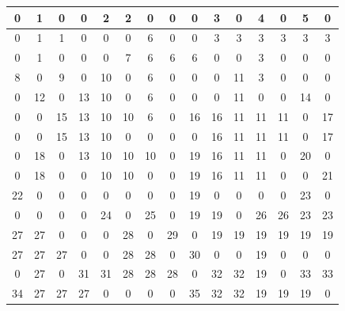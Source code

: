 \begin{figure}[H]
	\centering
	\scriptsize %
	\setlength{\tabcolsep}{3.5pt} %
	\renewcommand{\arraystretch}{1.3} %
	\begin{minipage}{0.4\textwidth}
		\centering
		\begin{center}
			\begin{tabular}{|*{15}{c|}}
				\hline
				0 & 1 & 0 & 0 & 2 & 2 & 0 & 0 & 0 & 3 & 0 & 4 & 0 & 5 & 0 \\
				\hline
				0 & 1 & 1 & 0 & 0 & 0 & 6 & 0 & 0 & 3 & 3 & 3 & 3 & 3 & 3 \\
				\hline
				0 & 1 & 0 & 0 & 0 & 7 & 6 & 6 & 6 & 0 & 0 & 3 & 0 & 0 & 0 \\
				\hline
				8 & 0 & 9 & 0 & 10 & 0 & 6 & 0 & 0 & 0 & 11 & 3 & 0 & 0 & 0 \\
				\hline
				0 & 12 & 0 & 13 & 10 & 0 & 6 & 0 & 0 & 0 & 11 & 0 & 0 & 14 & 0 \\
				\hline
				0 & 0 & 15 & 13 & 10 & 10 & 6 & 0 & 16 & 16 & 11 & 11 & 11 & 0 & 17 \\
				\hline
				0 & 0 & 15 & 13 & 10 & 0 & 0 & 0 & 0 & 16 & 11 & 11 & 11 & 0 & 17 \\
				\hline
				0 & 18 & 0 & 13 & 10 & 10 & 10 & 0 & 19 & 16 & 11 & 11 & 0 & 20 & 0 \\
				\hline
				0 & 18 & 0 & 0 & 10 & 10 & 0 & 0 & 19 & 16 & 11 & 11 & 0 & 0 & 21 \\
				\hline
				22 & 0 & 0 & 0 & 0 & 0 & 0 & 0 & 19 & 0 & 0 & 0 & 0 & 23 & 0 \\
				\hline
				0 & 0 & 0 & 0 & 24 & 0 & 25 & 0 & 19 & 19 & 0 & 26 & 26 & 23 & 23 \\
				\hline
				27 & 27 & 0 & 0 & 0 & 28 & 0 & 29 & 0 & 19 & 19 & 19 & 19 & 19 & 19 \\
				\hline
				27 & 27 & 27 & 0 & 0 & 28 & 28 & 0 & 30 & 0 & 0 & 19 & 0 & 0 & 0 \\
				\hline
				0 & 27 & 0 & 31 & 31 & 28 & 28 & 28 & 0 & 32 & 32 & 19 & 0 & 33 & 33 \\
				\hline
				34 & 27 & 27 & 27 & 0 & 0 & 0 & 0 & 35 & 32 & 32 & 19 & 19 & 19 & 0 \\
				\hline
			\end{tabular}
		\end{center}
	\end{minipage}
	\hfill
	\begin{minipage}{0.45\textwidth}
		\centering

\end{minipage}
\end{figure}
